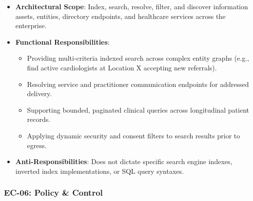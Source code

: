 \begin{itemize}

\item 
\textbf{Architectural Scope}: Index, search, resolve, filter, and discover information assets, entities, directory endpoints, and healthcare services across the enterprise.



\item 
\textbf{Functional Responsibilities}:


\begin{itemize}

\item 
Providing multi-criteria indexed search across complex entity graphs (e.g., find active cardiologists at Location X accepting new referrals).



\item 
Resolving service and practitioner communication endpoints for addressed delivery.



\item 
Supporting bounded, paginated clinical queries across longitudinal patient records.



\item 
Applying dynamic security and consent filters to search results prior to egress.



\end{itemize}


\item 
\textbf{Anti-Responsibilities}: Does not dictate specific search engine indexes, inverted index implementations, or SQL query syntaxes.



\end{itemize}
\label{rad:enterprise:148}
\subsubsection*{EC-06: Policy \& Control}
\label{rad:enterprise:149}

